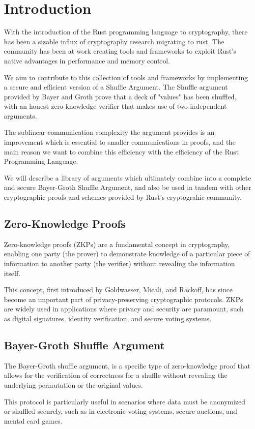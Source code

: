 \documentclass[12pt,a4paper]{report}
\begin{document}
\newpage
\listoftables

\newpage
{}

\chapter{Introduction}
With the introduction of the Rust programming language to cryptography, there has been a sizable influx of cryptography research migrating to rust. 
The community has been at work creating tools and frameworks to exploit Rust's native advantages in performance and memory control. \par
We aim to contribute to this collection of tools and frameworks by implementing a secure and efficient version of a Shuffle Argument.
The Shuffle argument provided by Bayer and Groth \cite{bgshuffle} prove that a deck of "values" has been shuffled, with an honest zero-knowledge verifier that makes use of two independent arguments.\par
The sublinear communication complexity the argument provides is an improvement which is essential to smaller communications in proofs, and the main reason we want to combine this efficiency with the efficiency of the Rust Programming Language.\par
We will describe a library of arguments which ultimately combine into a complete and secure Bayer-Groth Shuffle Argument, 
and also be used in tandem with other cryptographic proofs and schemes provided by Rust's cryptograhic community.
\section{Zero-Knowledge Proofs}
Zero-knowledge proofs (ZKPs) are a fundamental concept in cryptography, enabling one party 
(the prover) to demonstrate knowledge of a particular piece of information to another party 
(the verifier) without revealing the information itself.\par
This concept, first introduced by Goldwasser, Micali, and Rackoff\cite{zk}, has since become 
an important part of privacy-preserving cryptographic protocols. 
ZKPs are widely used in applications where privacy and security are paramount, 
such as digital signatures, identity verification, and secure voting systems.

\section{Bayer-Groth Shuffle Argument}
The Bayer-Groth shuffle argument\cite{bgshuffle}, is a specific type of zero-knowledge proof that
allows for the verification of correctness for a shuffle without revealing 
the underlying permutation or the original values. \par
This protocol is particularly useful in scenarios where data must be anonymized or shuffled 
securely, such as in electronic voting systems, secure auctions, and mental card games. \par
\end{document}
